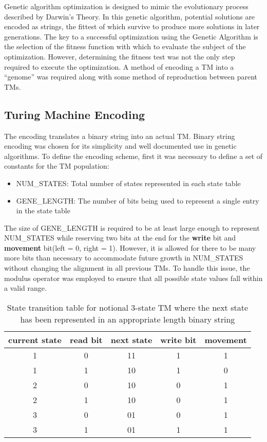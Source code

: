 Genetic algorithm optimization is designed to mimic the evolutionary process described by Darwin's Theory. In this genetic algorithm, potential solutions are encoded as strings, the fittest of which survive to produce more solutions in later generations. The key to a successful optimization using the Genetic Algorithm is the selection of the fitness function with which to evaluate the subject of the optimization. However, determining the fitness test was not the only step required to execute the optimization. A method of encoding a TM into a ``genome'' was required along with some method of reproduction between parent TMs. 

\subsection{Turing Machine Encoding} 

The encoding translates a binary string into an actual TM. Binary string encoding was chosen for its simplicity and well documented use in genetic algorithms. To define the encoding scheme, first it was necessary to define a set of constants for the TM population:
\begin{itemize}
\item NUM\_STATES: Total number of states represented in each state table
\item GENE\_LENGTH: The number of bits being used to represent a single entry in the state table
\end{itemize}

The size of GENE\_LENGTH is required to be at least large enough to represent NUM\_STATES while reserving two bits at the end for the {\bf write} bit and {\bf movement} bit(left = 0, right = 1). However, it is allowed for there to be many more bits than necessary to accommodate future growth in NUM\_STATES without changing the alignment in all previous TMs. To handle this issue, the modulus operator was employed to ensure that all possible state values fall within a valid range. 

\begin{table}[!htb]
	\centering
	\begin{tabular}{|c|c||c|c|c|} \hline
	{\bf current state} & {\bf read bit} & {\bf next state} & {\bf write bit} & {\bf movement} \\ \hline
	1 & 0 & 11 & 1 & 1\\ \hline
	1 & 1 & 10 & 1 & 0\\ \hline
	2 & 0 & 10 & 0 & 1\\ \hline
	2 & 1 & 10 & 0 & 1\\ \hline
	3 & 0 & 01 & 0 & 1\\ \hline
	3 & 1 & 01 & 1 & 1\\ \hline
	\end{tabular}
	\caption{State transition table for notional 3-state TM where the next state has been represented in an appropriate length binary string}
	\label{tab:example_TM}
\end{table}

